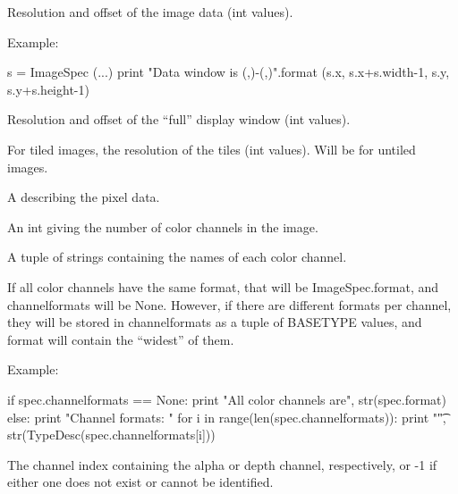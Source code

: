 Resolution and offset of the image data ({\cf int} values).

\noindent Example:
\begin{code}
    s = ImageSpec (...)
    print "Data window is ({},{})-({},{})".format (s.x, s.x+s.width-1,
                                                   s.y, s.y+s.height-1)
\end{code}
\apiend

Resolution and offset of the ``full'' display window ({\cf int} values).
\apiend

For tiled images, the resolution of the tiles ({\cf int} values).  Will be
{} for  untiled images.
\apiend

A \TypeDesc describing the pixel data.
\apiend

An {\cf int} giving the number of color channels in the image.
\apiend

A tuple of strings containing the names of each color channel.
\apiend

If all color channels have the same format, that will be {\cf ImageSpec.format},
and {\cf channelformats} will be {\cf None}.  However, if there are different
formats per channel, they will be stored in {\cf channelformats} as a tuple
of BASETYPE values, and {\cf format} will contain the ``widest'' of them.

\noindent Example:
\begin{code}
    if spec.channelformats == None:
        print "All color channels are", str(spec.format)
    else:
        print "Channel formats: "
        for i in range(len(spec.channelformats)):
            print "\t", str(TypeDesc(spec.channelformats[i]))
\end{code}
\apiend

The channel index containing the alpha or depth channel, respectively, or
-1 if either one does not exist or cannot be identified.
\apiend


